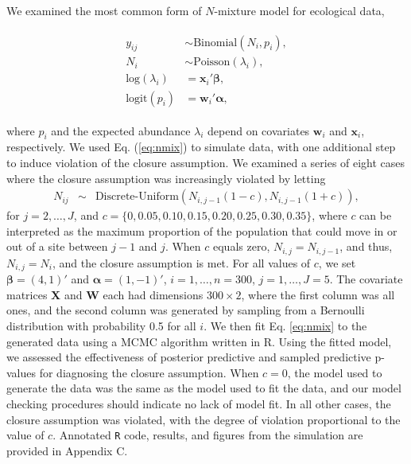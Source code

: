 \documentclass[12pt,english]{article}
\begin{document}
\begin{spacing}{1.9}
We examined the most common form of $N$-mixture model for ecological
data,
\begin{linenomath}
  \begin{align}
    \begin{split}
      y_{ij} & \sim \text{Binomial}(N_{i},p_i),\\
      N_{i} & \sim \text{Poisson}(\lambda_{i}), \\
      \text{log}(\lambda_i) & = \textbf{x}_i'\boldsymbol{\beta},
      \\
      \text{logit}(p_i) & = \textbf{w}_i'\boldsymbol{\alpha},
    \end{split}
                          \label{eq:nmix}
  \end{align}
\end{linenomath}
where $p_i$ and the expected abundance $\lambda_i$ depend on
covariates $\textbf{w}_i$ and $\textbf{x}_i$, respectively. We used
Eq. (\ref{eq:nmix}) to simulate data, with one additional step to
induce violation of the closure assumption. We examined a series of
eight cases where the closure assumption was increasingly violated by
letting
\begin{eqnarray*}
  N_{ij} & \sim & \text{Discrete-Uniform}(N_{i,j-1}(1-c), N_{i,j-1}(1+c)),
\end{eqnarray*}
for $j=2,\ldots,J$, and
$c = \{0, 0.05, 0.10, 0.15, 0.20, 0.25, 0.30, 0.35 \}$, where $c$ can
be interpreted as the maximum proportion of the population that could
move in or out of a site between $j-1$ and $j$. When $c$ equals zero,
$N_{i,j}=N_{i,j-1}$, and thus, $N_{i,j}=N_i$, and the closure
assumption is met.  For all values of $c$, we set
$\boldsymbol{\beta}=(4,1)'$ and $\boldsymbol{\alpha}=(1,-1)'$,
$i=1,\ldots,n=300$, $j=1,\ldots,J=5$. The covariate matrices
\textbf{X} and \textbf{W} each had dimensions $300\times 2$, where the
first column was all ones, and the second column was generated by
sampling from a Bernoulli distribution with probability 0.5 for all
$i$. We then fit Eq. \ref{eq:nmix} to the generated data using a MCMC
algorithm written in R. Using the fitted model, we assessed the
effectiveness of posterior predictive and sampled predictive p-values
for diagnosing the closure assumption. When $c=0$, the model used to
generate the data was the same as the model used to fit the data, and
our model checking procedures should indicate no lack of model fit. In
all other cases, the closure assumption was violated, with the degree
of violation proportional to the value of $c$. Annotated \texttt{R}
code, results, and figures from the simulation are provided in
Appendix C.


\end{spacing}
\end{document}
